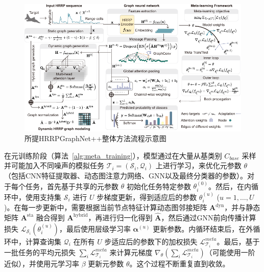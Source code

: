 \begin{figure}[h]
    \centering
    \includegraphics[width=\linewidth]{figures/method1.pdf} %
    \caption{所提HRRPGraphNet++整体方法流程示意图}
    \label{fig:dataset_chap3}
\end{figure}

在元训练阶段（算法~\ref{alg:meta_training}），模型通过在大量从基类别 $C_{base}$ 采样并可能加入不同噪声的模拟任务 $\mathcal{T}_i=(\mathcal{S}_i, \mathcal{Q}_i)$ 上进行学习，来优化元参数 $\theta$（包括CNN特征提取器、动态图注意力网络、GNN以及最终分类器的参数）。对于每个任务，首先基于共享的元参数 $\theta$ 初始化任务特定参数 $\theta_i^{(0)}$。然后，在内循环中，使用支持集 $\mathcal{S}_i$ 进行 $U$ 步梯度更新，得到适应后的参数 $\theta_i^{(u)}$ ($u=1, \dots, U$)。在每一步更新中，需要根据当前节点特征计算动态图邻接矩阵 $\mathbf{A}^{\text{dyn}}$，并与静态矩阵 $\mathbf{A}^{\text{sta}}$ 融合得到 $\mathbf{A}^{\text{hybrid}}$，再进行归一化得到 $\hat{\mathbf{A}}$，然后通过GNN前向传播计算损失 $\mathcal{L}_{\mathcal{S}_i}(\theta_i^{(u)})$，最后使用层级学习率 $\boldsymbol{\alpha}^{(u)}$ 更新参数。内循环结束后，在外循环中，计算查询集 $\mathcal{Q}_i$ 在所有 $U$ 步适应后的参数下的加权损失 $\mathcal{L}_{\mathcal{T}_i}^{meta}$。最后，基于一批任务的平均元损失 $\sum_i \mathcal{L}_{\mathcal{T}_i}^{meta}$ 来计算元梯度 $\nabla_\theta (\sum_i \mathcal{L}_{\mathcal{T}_i}^{meta})$（可能使用一阶近似），并使用元学习率 $\beta$ 更新元参数 $\theta$。这个过程不断重复直到收敛。

